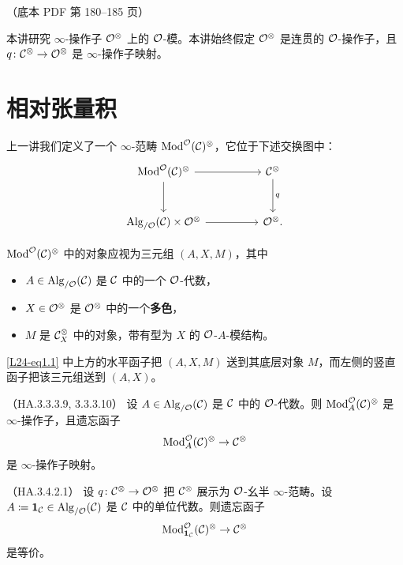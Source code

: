 \begin{center}\small\color{black!55}（底本 PDF 第 180–185 页）\end{center}

本讲研究 $\infty$-操作子 $\mathcal{O}^{\otimes}$ 上的 $\mathcal{O}$-模。本讲始终假定 $\mathcal{O}^{\otimes}$ 是连贯的 $\mathcal{O}$-操作子，且 $q\colon\mathcal{C}^{\otimes}\to\mathcal{O}^{\otimes}$ 是 $\infty$-操作子映射。

\section{相对张量积}

\nitem\label{L24-1.1} 上一讲我们定义了一个 $\infty$-范畴 $\operatorname{Mod}^{\mathcal{O}}(\mathcal{C})^{\otimes}$，它位于下述交换图中：
\begin{equation}\label{L24-eq1.1}
\begin{tikzcd}[column sep=4.8em,row sep=2.8em]
\Mod^{\OO}(\cC)^{\otimes} \arrow[r] \arrow[d] & \cC^{\otimes} \arrow[d, "q"] \\
\Alg_{/\OO}(\cC)\times\OO^{\otimes} \arrow[r] & \OO^{\otimes}.
\end{tikzcd}
\end{equation}

$\operatorname{Mod}^{\mathcal{O}}(\mathcal{C})^{\otimes}$ 中的对象应视为三元组 $(A,X,M)$，其中
\begin{itemize}[leftmargin=2.2em,itemsep=0.1em]
\item $A\in\operatorname{Alg}_{/\mathcal{O}}(\mathcal{C})$ 是 $\mathcal{C}$ 中的一个 $\mathcal{O}$-代数，
\item $X\in\mathcal{O}^{\otimes}$ 是 $\mathcal{O}^{\otimes}$ 中的一个\textbf{多色}，
\item $M$ 是 $\mathcal{C}^{\otimes}_{X}$ 中的对象，带有型为 $X$ 的 $\mathcal{O}$-$A$-模结构。
\end{itemize}
\eqref{L24-eq1.1} 中上方的水平函子把 $(A,X,M)$ 送到其底层对象 $M$，而左侧的竖直函子把该三元组送到 $(A,X)$。

\begin{theorem}\label{L24-1.2}（HA.3.3.3.9, 3.3.3.10）
设 $A\in\operatorname{Alg}_{/\mathcal{O}}(\mathcal{C})$ 是 $\mathcal{C}$ 中的 $\mathcal{O}$-代数。则 $\operatorname{Mod}^{\mathcal{O}}_{A}(\mathcal{C})^{\otimes}$ 是 $\infty$-操作子，且遗忘函子
\[
\operatorname{Mod}^{\mathcal{O}}_{A}(\mathcal{C})^{\otimes}\to\mathcal{C}^{\otimes}
\]
是 $\infty$-操作子映射。
\end{theorem}

\begin{proposition}\label{L24-1.3}（HA.3.4.2.1）
设 $q\colon\mathcal{C}^{\otimes}\to\mathcal{O}^{\otimes}$ 把 $\mathcal{C}^{\otimes}$ 展示为 $\mathcal{O}$-幺半 $\infty$-范畴。设 $A\coloneqq\mathbf{1}_{\mathcal{C}}\in\operatorname{Alg}_{/\mathcal{O}}(\mathcal{C})$ 是 $\mathcal{C}$ 中的单位代数。则遗忘函子
\[
\operatorname{Mod}^{\mathcal{O}}_{\mathbf{1}_{\mathcal{C}}}(\mathcal{C})^{\otimes}\to\mathcal{C}^{\otimes}
\]
是等价。
\end{proposition}

